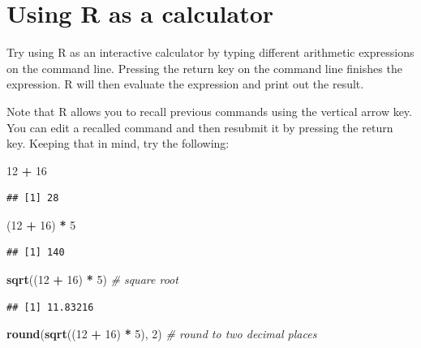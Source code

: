\documentclass[
]{book}
\newenvironment{Shaded}{\begin{snugshade}}{\end{snugshade}}
\newcommand{\CommentTok}[1]{\textcolor[rgb]{0.56,0.35,0.01}{\textit{#1}}}
\newcommand{\DecValTok}[1]{\textcolor[rgb]{0.00,0.00,0.81}{#1}}
\newcommand{\FunctionTok}[1]{\textcolor[rgb]{0.13,0.29,0.53}{\textbf{#1}}}
\newcommand{\NormalTok}[1]{#1}
\newcommand{\SpecialCharTok}[1]{\textcolor[rgb]{0.81,0.36,0.00}{\textbf{#1}}}
\theoremstyle{definition}
\theoremstyle{definition}
\theoremstyle{definition}
\theoremstyle{definition}
\theoremstyle{remark}
\begin{document}
\section{Using R as a calculator}\label{using-r-as-a-calculator}

Try using R as an interactive calculator by typing different
arithmetic expressions on the command line. Pressing the return key
on the command line finishes the expression. R will then evaluate the
expression and print out the result.

Note that R allows you to recall previous commands using the vertical
arrow key. You can edit a recalled command and then resubmit it by
pressing the return key. Keeping that in mind, try the following:

\begin{Shaded}
\begin{Highlighting}[]
\DecValTok{12} \SpecialCharTok{+} \DecValTok{16}
\end{Highlighting}
\end{Shaded}

\begin{verbatim}
## [1] 28
\end{verbatim}

\begin{Shaded}
\begin{Highlighting}[]
\NormalTok{(}\DecValTok{12} \SpecialCharTok{+} \DecValTok{16}\NormalTok{) }\SpecialCharTok{*} \DecValTok{5}
\end{Highlighting}
\end{Shaded}

\begin{verbatim}
## [1] 140
\end{verbatim}

\begin{Shaded}
\begin{Highlighting}[]
\FunctionTok{sqrt}\NormalTok{((}\DecValTok{12} \SpecialCharTok{+} \DecValTok{16}\NormalTok{) }\SpecialCharTok{*} \DecValTok{5}\NormalTok{) }\CommentTok{\# square root}
\end{Highlighting}
\end{Shaded}

\begin{verbatim}
## [1] 11.83216
\end{verbatim}

\begin{Shaded}
\begin{Highlighting}[]
\FunctionTok{round}\NormalTok{(}\FunctionTok{sqrt}\NormalTok{((}\DecValTok{12} \SpecialCharTok{+} \DecValTok{16}\NormalTok{) }\SpecialCharTok{*} \DecValTok{5}\NormalTok{), }\DecValTok{2}\NormalTok{) }\CommentTok{\# round to two decimal places}
\end{Highlighting}
\end{Shaded}
\end{document}
